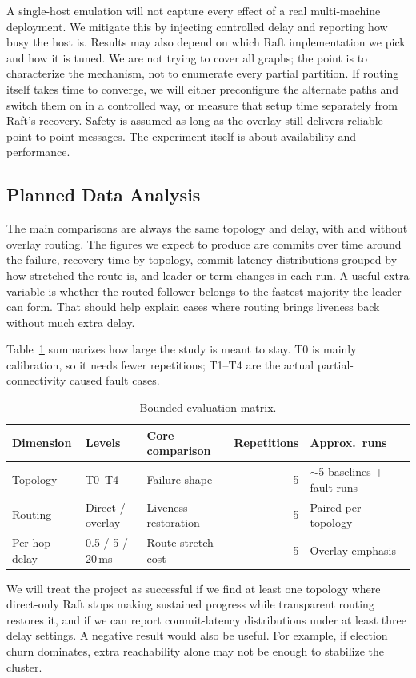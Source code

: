 \documentclass[11pt,a4paper]{article}
\begin{document}
A single-host emulation will not capture every effect of a real multi-machine deployment. We mitigate this by injecting controlled delay and reporting how busy the host is. Results may also depend on which Raft implementation we pick and how it is tuned. We are not trying to cover all graphs; the point is to characterize the mechanism, not to enumerate every partial partition. If routing itself takes time to converge, we will either preconfigure the alternate paths and switch them on in a controlled way, or measure that setup time separately from Raft's recovery. Safety is assumed as long as the overlay still delivers reliable point-to-point messages. The experiment itself is about availability and performance.

\subsection{Planned Data Analysis}

The main comparisons are always the same topology and delay, with and without overlay routing. The figures we expect to produce are commits over time around the failure, recovery time by topology, commit-latency distributions grouped by how stretched the route is, and leader or term changes in each run. A useful extra variable is whether the routed follower belongs to the fastest majority the leader can form. That should help explain cases where routing brings liveness back without much extra delay.

Table~\ref{tab:matrix} summarizes how large the study is meant to stay. T0 is mainly calibration, so it needs fewer repetitions; T1--T4 are the actual partial-connectivity caused fault cases.

\begin{table}[h]
  \centering
  \small
  \begin{tabular}{p{2.3cm}p{2.3cm}p{3.2cm}rp{2.2cm}}
    \hline
    Dimension & Levels & Core comparison & Repetitions & Approx.\ runs \\
    \hline
    Topology & T0--T4 & Failure shape & 5 & $\sim$5 baselines + fault runs \\
    Routing & Direct / overlay & Liveness restoration & 5 & Paired per topology \\
    Per-hop delay & 0.5 / 5 / 20\,ms & Route-stretch cost & 5 & Overlay emphasis \\
    \hline
  \end{tabular}
  \caption{Bounded evaluation matrix.}
  \label{tab:matrix}
\end{table}

We will treat the project as successful if we find at least one topology where direct-only Raft stops making sustained progress while transparent routing restores it, and if we can report commit-latency distributions under at least three delay settings. A negative result would also be useful. For example, if election churn dominates, extra reachability alone may not be enough to stabilize the cluster.



\end{document}
